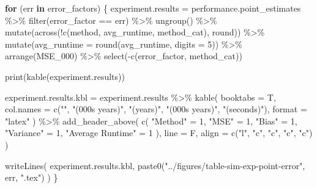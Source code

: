 \documentclass[
]{article}
\newenvironment{Shaded}{\begin{snugshade}}{\end{snugshade}}
\newcommand{\AttributeTok}[1]{\textcolor[rgb]{0.77,0.63,0.00}{#1}}
\newcommand{\ControlFlowTok}[1]{\textcolor[rgb]{0.13,0.29,0.53}{\textbf{#1}}}
\newcommand{\DecValTok}[1]{\textcolor[rgb]{0.00,0.00,0.81}{#1}}
\newcommand{\FunctionTok}[1]{\textcolor[rgb]{0.00,0.00,0.00}{#1}}
\newcommand{\NormalTok}[1]{#1}
\newcommand{\OtherTok}[1]{\textcolor[rgb]{0.56,0.35,0.01}{#1}}
\newcommand{\SpecialCharTok}[1]{\textcolor[rgb]{0.00,0.00,0.00}{#1}}
\newcommand{\StringTok}[1]{\textcolor[rgb]{0.31,0.60,0.02}{#1}}
\begin{document}
\begin{Shaded}
\begin{Highlighting}[]
\ControlFlowTok{for}\NormalTok{ (err }\ControlFlowTok{in}\NormalTok{ error\_factors) \{}
\NormalTok{  experiment.results }\OtherTok{=}\NormalTok{ performance.point\_estimates }\SpecialCharTok{\%\textgreater{}\%}
    \FunctionTok{filter}\NormalTok{(error\_factor }\SpecialCharTok{==}\NormalTok{ err) }\SpecialCharTok{\%\textgreater{}\%}
    \FunctionTok{ungroup}\NormalTok{() }\SpecialCharTok{\%\textgreater{}\%}
    \FunctionTok{mutate}\NormalTok{(}\FunctionTok{across}\NormalTok{(}\SpecialCharTok{!}\FunctionTok{c}\NormalTok{(method, avg\_runtime, method\_cat), round)) }\SpecialCharTok{\%\textgreater{}\%}
    \FunctionTok{mutate}\NormalTok{(}\AttributeTok{avg\_runtime =} \FunctionTok{round}\NormalTok{(avg\_runtime, }\AttributeTok{digits =} \DecValTok{5}\NormalTok{)) }\SpecialCharTok{\%\textgreater{}\%}
    \FunctionTok{arrange}\NormalTok{(MSE\_000) }\SpecialCharTok{\%\textgreater{}\%}
    \FunctionTok{select}\NormalTok{(}\SpecialCharTok{{-}}\FunctionTok{c}\NormalTok{(error\_factor, method\_cat))}
  
  \FunctionTok{print}\NormalTok{(}\FunctionTok{kable}\NormalTok{(experiment.results))}
  
\NormalTok{  experiment.results.kbl }\OtherTok{=}\NormalTok{ experiment.results }\SpecialCharTok{\%\textgreater{}\%}
    \FunctionTok{kable}\NormalTok{(}
      \AttributeTok{booktabs =}\NormalTok{ T,}
      \AttributeTok{col.names =} \FunctionTok{c}\NormalTok{(}\StringTok{""}\NormalTok{, }\StringTok{"(000\textquotesingle{}s years)"}\NormalTok{, }\StringTok{"(years)"}\NormalTok{, }\StringTok{"(000\textquotesingle{}s years)"}\NormalTok{, }\StringTok{"(seconds)"}\NormalTok{),}
      \AttributeTok{format =} \StringTok{"latex"}
\NormalTok{    ) }\SpecialCharTok{\%\textgreater{}\%}
    \FunctionTok{add\_header\_above}\NormalTok{(}
      \FunctionTok{c}\NormalTok{(}
        \StringTok{"Method"} \OtherTok{=} \DecValTok{1}\NormalTok{,}
        \StringTok{"MSE"} \OtherTok{=} \DecValTok{1}\NormalTok{,}
        \StringTok{"Bias"} \OtherTok{=} \DecValTok{1}\NormalTok{,}
        \StringTok{"Variance"} \OtherTok{=} \DecValTok{1}\NormalTok{,}
        \StringTok{"Average Runtime"} \OtherTok{=} \DecValTok{1}
\NormalTok{      ),}
      \AttributeTok{line =}\NormalTok{ F,}
      \AttributeTok{align =} \FunctionTok{c}\NormalTok{(}\StringTok{"l"}\NormalTok{, }\StringTok{"c"}\NormalTok{, }\StringTok{"c"}\NormalTok{, }\StringTok{"c"}\NormalTok{, }\StringTok{"c"}\NormalTok{)}
\NormalTok{    )}
  
  \FunctionTok{writeLines}\NormalTok{(}
\NormalTok{    experiment.results.kbl,}
    \FunctionTok{paste0}\NormalTok{(}\StringTok{"../figures/table{-}sim{-}exp{-}point{-}error"}\NormalTok{, err, }\StringTok{".tex"}\NormalTok{)}
\NormalTok{  )}
\NormalTok{\}}
\end{Highlighting}
\end{Shaded}
\end{document}
